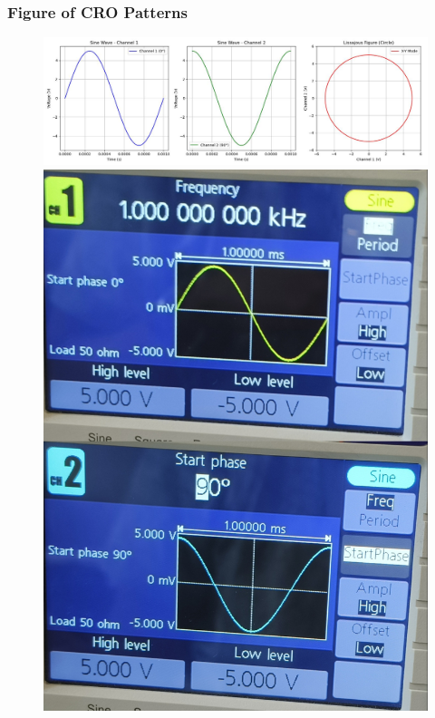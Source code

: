 \documentclass[12pt,a4paper]{report}
\begin{document}
\subsubsection*{Figure of CRO Patterns}
\begin{figure}[H] %
    \centering
    \includegraphics[width=\textwidth]{figs/2.jpg} %
    \begin{minipage}[c]{0.48\textwidth}
        \includegraphics[width=\textwidth]{figs/2read.jpg} %
        

\end{minipage}
\end{figure}
\end{document}
